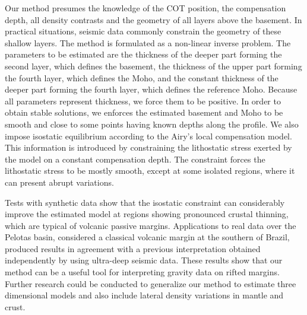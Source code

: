 \documentclass[manuscript]{geophysics}
\begin{document}
Our method presumes the knowledge of the COT position, the compensation depth,
all density contrasts and the geometry of all layers above the basement.
In practical situations, 
seismic data commonly constrain the geometry of these shallow layers.
The method is formulated as a non-linear inverse problem. 
The parameters to be estimated are the thickness of the deeper part forming the 
second layer, which defines the basement, the thickness of the upper part forming the 
fourth layer, which defines the Moho, and the constant thickness of the deeper part forming 
the fourth layer, which defines the reference Moho.
Because all parameters represent thickness, we force them to be positive.
In order to obtain stable solutions, we enforces the estimated basement and Moho to be 
smooth and close to some points having known depths along the profile.
We also impose isostatic equilibrium according to the Airy's local compensation model.
This information is introduced by constraining the lithostatic stress
exerted by the model on a constant compensation depth. The constraint forces the
lithostatic stress to be mostly smooth, except at some isolated regions, where it can
present abrupt variations.

Tests with synthetic data show that the isostatic constraint can considerably improve 
the estimated model at regions showing pronounced crustal thinning, which 
are typical of volcanic passive margins. 
Applications to real data over the Pelotas basin, considered a classical volcanic
margin at the southern of Brazil, produced results in agreement with a previous 
interpretation obtained independently by using ultra-deep seismic data.
These results show that our method can be a useful tool for interpreting
gravity data on rifted margins.
Further research could be conducted to generalize our method to estimate
three dimensional models and also include lateral density variations in 
mantle and crust.

\end{document}
